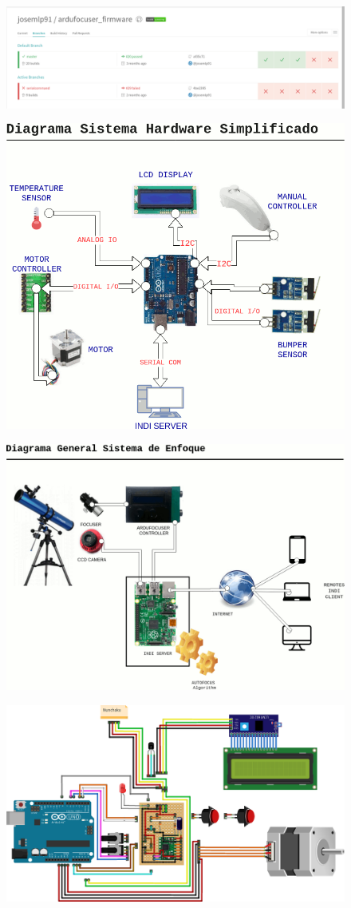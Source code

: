\begin{figure}[h]
\centering
\includegraphics[width=1\linewidth]{../images/travis_ci}
\caption{}
\label{fig:travis_ci}
\end{figure}


\begin{figure}[h]
	\centering
	\includegraphics[width=0.7\linewidth]{../images/diagramaHardware}
	\caption{}
	\label{fig:diagramaHardware}
\end{figure}

\begin{figure}[h]
	\centering
	\includegraphics[width=0.7\linewidth]{../images/diagramaGeneral}
	\caption{}
	\label{fig:diagramaHardware}
\end{figure}


\begin{figure}[h]
	\centering
	\includegraphics[width=0.7\linewidth]{../images/circuito}
	\caption{}
	\label{fig:diagramaHardware}
\end{figure}


